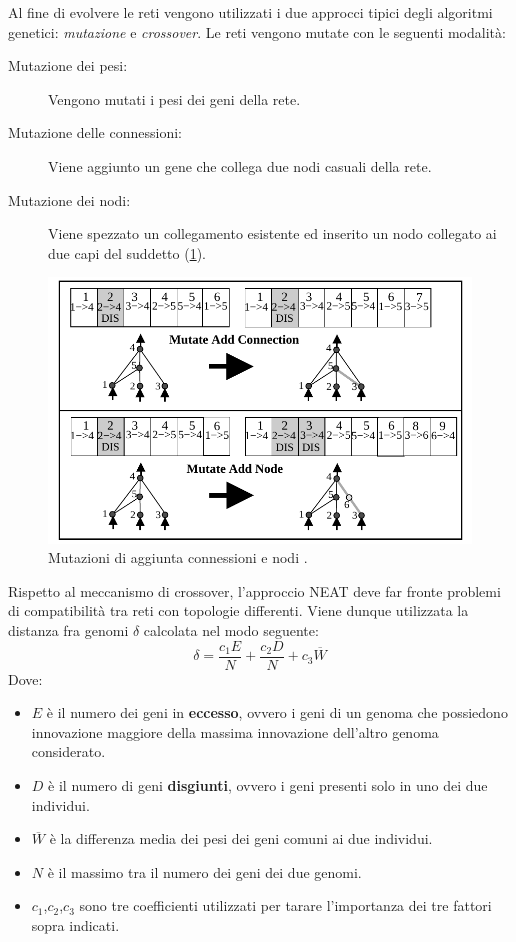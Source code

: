 Al fine di evolvere le reti vengono utilizzati i due approcci tipici degli
algoritmi genetici: \emph{mutazione} e \emph{crossover}.
Le reti vengono mutate con le seguenti modalità:
\begin{description}
	\item[Mutazione dei pesi:] Vengono mutati i pesi dei geni della rete.
	\item[Mutazione delle connessioni:] Viene aggiunto un gene che collega
	due nodi casuali della rete.
	\item[Mutazione dei nodi:] Viene spezzato un collegamento esistente ed
	inserito un nodo collegato ai due capi del suddetto
	(\cref{fig:nodemutate}).
\end{description}

\begin{figure}[H]
	\includegraphics[width=\textwidth]{img/neat-mutation.png}
	\caption{Mutazioni di aggiunta connessioni e nodi
	\cite{stanley2002evolving}.}
	\label{fig:nodemutate}
\end{figure}

Rispetto al meccanismo di crossover, l'approccio NEAT deve far fronte problemi
di compatibilità tra reti con topologie differenti. Viene dunque utilizzata la
distanza fra genomi $\delta$ calcolata nel modo seguente:
\[\delta = \frac{c_1 E}{N} + \frac{c_2 D}{N} + c_3 \overline{W}\]
Dove:
\begin{itemize}
	\item $E$ è il numero dei geni in \textbf{eccesso}, ovvero i geni
	di un genoma che possiedono innovazione maggiore della massima
	innovazione dell'altro genoma considerato.
	\item $D$ è il numero di geni \textbf{disgiunti}, ovvero i geni presenti
	solo in uno dei due individui.
	\item $\overline{W}$ è la differenza media dei pesi dei geni comuni ai
	due individui.
	\item $N$ è il massimo tra il numero dei geni dei due genomi.

	\item $c_1$,$c_2$,$c_3$ sono tre coefficienti utilizzati per tarare
	l'importanza dei tre fattori sopra indicati.
\end{itemize}

